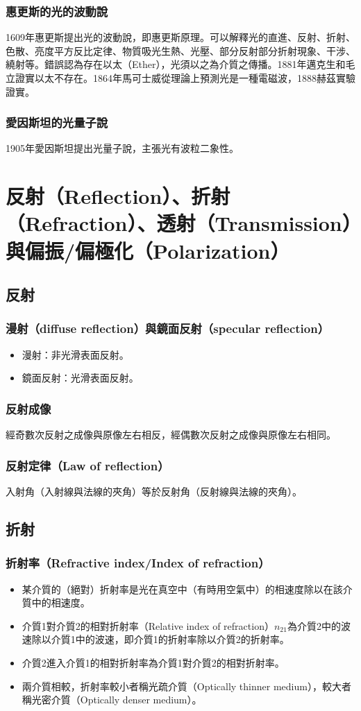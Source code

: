 \documentclass[a4paper,12pt]{report}
\begin{document}
\subsubsection{惠更斯的光的波動說}
1609年惠更斯提出光的波動說，即惠更斯原理。可以解釋光的直進、反射、折射、色散、亮度平方反比定律、物質吸光生熱、光壓、部分反射部分折射現象、干涉、繞射等。錯誤認為存在以太（Ether），光須以之為介質之傳播。1881年邁克生和毛立證實以太不存在。1864年馬可士威從理論上預測光是一種電磁波，1888赫茲實驗證實。
\subsubsection{愛因斯坦的光量子說}
1905年愛因斯坦提出光量子說，主張光有波粒二象性。


\section{反射（Reflection）、折射（Refraction）、透射（Transmission）與偏振/偏極化（Polarization）}
\subsection{反射}
\subsubsection{漫射（diffuse reflection）與鏡面反射（specular reflection）}
\begin{itemize}
\item 漫射：非光滑表面反射。
\item 鏡面反射：光滑表面反射。
\end{itemize}
\subsubsection{反射成像}
經奇數次反射之成像與原像左右相反，經偶數次反射之成像與原像左右相同。
\subsubsection{反射定律（Law of reflection）}
入射角（入射線與法線的夾角）等於反射角（反射線與法線的夾角）。
\subsection{折射}
\subsubsection{折射率（Refractive index/Index of refraction）}
\begin{itemize}
\item 某介質的（絕對）折射率是光在真空中（有時用空氣中）的相速度除以在該介質中的相速度。
\item 介質1對介質2的相對折射率（Relative index of refraction）$n_{21}$為介質2中的波速除以介質1中的波速，即介質1的折射率除以介質2的折射率。
\item 介質2進入介質1的相對折射率為介質1對介質2的相對折射率。
\item 兩介質相較，折射率較小者稱光疏介質（Optically thinner medium），較大者稱光密介質（Optically denser medium）。
\end{itemize}
\end{document}
